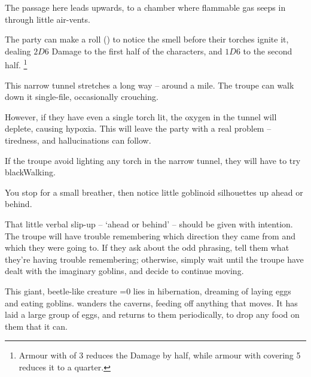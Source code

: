 \begin{multicols}{2}

The passage here leads upwards, to a chamber where flammable gas seeps in through little air-vents.

The party can make a  roll (\tn[12]) to notice the smell before their torches ignite it, dealing $2D6$ Damage to the first half of the characters, and $1D6$ to the second half.%
\footnote{Armour with  of 3 reduces the Damage by half, while armour with \gls{covering} 5 reduces it to a quarter.}



This narrow tunnel stretches a long way -- around a mile.
The troupe can walk down it single-file, occasionally crouching.

However, if they have even a single torch lit, the oxygen in the tunnel will deplete, causing \gls{hypoxia}.
This will leave the party with a real problem -- tiredness, and hallucinations can follow.

If the troupe avoid lighting any torch in the narrow tunnel, they will have to try \gls{blackWalking}.

\begin{boxtext}
  You stop for a small breather, then notice little goblinoid silhouettes up ahead or behind.
\end{boxtext}

That little verbal slip-up -- `ahead or behind' -- should be given with intention.
The troupe will have trouble remembering which direction they came from and which they were going to.
If they ask about the odd phrasing, tell them what they're having trouble remembering; otherwise, simply wait until the troupe have dealt with the imaginary goblins, and decide to continue moving.



\begin{exampletext}
  This giant, beetle-like creature%
  \ifnum\value{temperature}=0
    lies in hibernation, dreaming of laying eggs and eating goblins.
  \else
    wanders the caverns, feeding off anything that moves.
    It has laid a large group of eggs, and returns to them periodically, to drop any food on them that it can.
  \fi
\end{exampletext}


\end{multicols}
